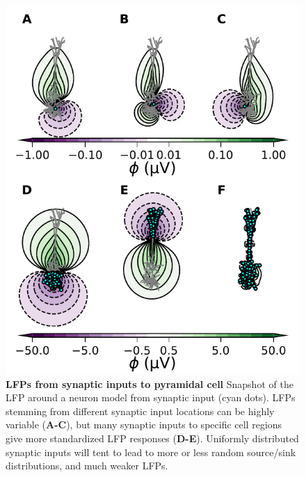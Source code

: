 \begin{figure}[!ht]
\begin{center}
\includegraphics[width=.6\textwidth]{Figures/LFP/fig_chosen_dipoles.pdf}
\end{center}
\caption{\textbf{LFPs from synaptic inputs to pyramidal cell}
Snapshot of the LFP around a neuron model from synaptic input (cyan dots). LFPs stemming from different synaptic input locations can be highly variable ({\bf A-C}), but many synaptic inputs to specific cell regions give more standardized LFP responses ({\bf D-E}). Uniformly distributed synaptic inputs will tent to lead to more or less random source/sink distributions, and much weaker LFPs.
}
\label{LFP:fig:LFP_dipoles}
\end{figure}


